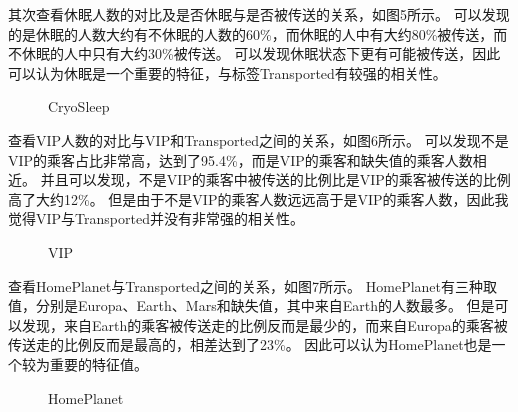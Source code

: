 \documentclass[../main.tex]{subfiles}
\begin{document}
        其次查看休眠人数的对比及是否休眠与是否被传送的关系，如图5所示。
        可以发现的是休眠的人数大约有不休眠的人数的60\%，而休眠的人中有大约80\%被传送，而不休眠的人中只有大约30\%被传送。
        可以发现休眠状态下更有可能被传送，因此可以认为休眠是一个重要的特征，与标签Transported有较强的相关性。

        \begin{figure}[H]
            \centering
            \label{tu2_5}
            \caption{CryoSleep}
        \end{figure}

        查看VIP人数的对比与VIP和Transported之间的关系，如图6所示。
        可以发现不是VIP的乘客占比非常高，达到了95.4\%，而是VIP的乘客和缺失值的乘客人数相近。
        并且可以发现，不是VIP的乘客中被传送的比例比是VIP的乘客被传送的比例高了大约12\%。
        但是由于不是VIP的乘客人数远远高于是VIP的乘客人数，因此我觉得VIP与Transported并没有非常强的相关性。

        \begin{figure}[H]
            \centering
            \label{tu2_6}
            \caption{VIP}
        \end{figure}

        查看HomePlanet与Transported之间的关系，如图7所示。
        HomePlanet有三种取值，分别是Europa、Earth、Mars和缺失值，其中来自Earth的人数最多。
        但是可以发现，来自Earth的乘客被传送走的比例反而是最少的，而来自Europa的乘客被传送走的比例反而是最高的，相差达到了23\%。
        因此可以认为HomePlanet也是一个较为重要的特征值。

        \begin{figure}[H]
            \centering
            \label{tu2_7}
            \caption{HomePlanet}
        \end{figure}
\end{document}
